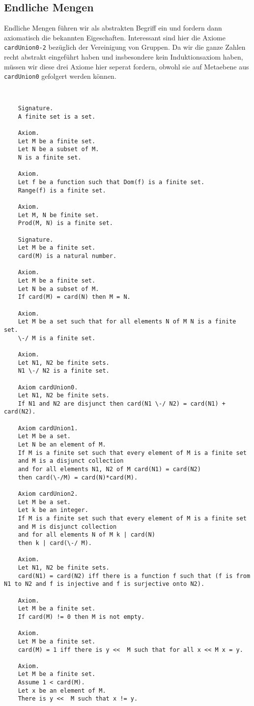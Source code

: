 \documentclass[a4paper,12pt]{scrartcl}
\begin{document}
\subsection{Endliche Mengen}

Endliche Mengen führen wir als abstrakten Begriff ein und fordern dann axiomatisch die bekannten Eigeschaften. Interessant sind hier die Axiome \verb!cardUnion0-2! bezüglich der Vereinigung von Gruppen. Da wir die ganze Zahlen recht abstrakt eingeführt haben und insbesondere kein Induktionsaxiom haben, müssen wir diese drei Axiome hier seperat fordern, obwohl sie auf Metaebene aus \verb!cardUnion0! gefolgert werden können.

\begin{lstlisting}


	Signature.
	A finite set is a set.
	
	Axiom.
	Let M be a finite set.
	Let N be a subset of M.
	N is a finite set.
	
	Axiom.
	Let f be a function such that Dom(f) is a finite set.
	Range(f) is a finite set.
	
	Axiom.
	Let M, N be finite set.
	Prod(M, N) is a finite set.
	
	Signature.
	Let M be a finite set.
	card(M) is a natural number.
	
	Axiom.
	Let M be a finite set.
	Let N be a subset of M.
	If card(M) = card(N) then M = N.
	
	Axiom.
	Let M be a set such that for all elements N of M N is a finite set.
	\-/ M is a finite set.
	
	Axiom.
	Let N1, N2 be finite sets.
	N1 \-/ N2 is a finite set.
	
	Axiom cardUnion0.
	Let N1, N2 be finite sets.
	If N1 and N2 are disjunct then card(N1 \-/ N2) = card(N1) + card(N2).
	
	Axiom cardUnion1.
	Let M be a set.
	Let N be an element of M.
	If M is a finite set such that every element of M is a finite set
	and M is a disjunct collection 
	and for all elements N1, N2 of M card(N1) = card(N2)
	then card(\-/M) = card(N)*card(M).
	
	Axiom cardUnion2.
	Let M be a set.
	Let k be an integer.
	If M is a finite set such that every element of M is a finite set
	and M is disjunct collection
	and for all elements N of M k | card(N)
	then k | card(\-/ M).
	
	Axiom.
	Let N1, N2 be finite sets.
	card(N1) = card(N2) iff there is a function f such that (f is from N1 to N2 and f is injective and f is surjective onto N2).
	
	Axiom.
	Let M be a finite set.
	If card(M) != 0 then M is not empty.
	
	Axiom.
	Let M be a finite set.
	card(M) = 1 iff there is y <<  M such that for all x << M x = y.
	
	Axiom.
	Let M be a finite set.
	Assume 1 < card(M).
	Let x be an element of M.
	There is y <<  M such that x != y.

\end{lstlisting}
\end{document}
